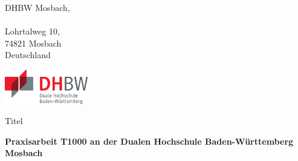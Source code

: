 \def\title{Titel}
\def\author{Autor}


\begin{titlepage}


\begin{minipage}[c]{0.25\textwidth}
DHBW Mosbach,\\ \\
Lohrtalweg 10,\\
74821 Mosbach\\
Deutschland
\end{minipage}
\hfill
\begin{minipage}[c]{0.25\textwidth}
\includegraphics[height=1.5cm]{prefix/image/logo-dhbw.eps}
\end{minipage}




\begin{center}
	\vspace{15mm}
	
	\LARGE \title
	
	\vspace{15pt}
	
	\large \bfseries Praxisarbeit T1000 an der Dualen Hochschule Baden-Württemberg Mosbach

	
\end{center}


\end{titlepage}
